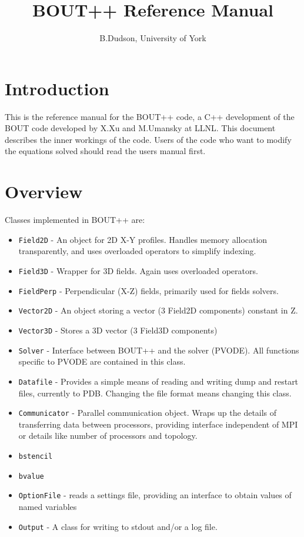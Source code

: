 \documentclass[12pt, a4paper]{article}
\newcommand{\code}[1]{\texttt{#1}}
\begin{document}
\title{BOUT++ Reference Manual}
\author{B.Dudson, University of York}

\maketitle

\tableofcontents

\section{Introduction}

This is the reference manual for the BOUT++ code\cite{Dudson2009,dudson-2008-arxiv}, a C++ development of the
BOUT code developed by X.Xu and M.Umansky at LLNL. This document describes
the inner workings of the code. Users of the code who want to modify 
the equations solved should read the users manual first.

\section{Overview}

Classes implemented in BOUT++ are:
\begin{itemize}
\item \code{Field2D} - An object for 2D X-Y profiles. Handles memory allocation transparently,
  and uses overloaded operators to simplify indexing.
\item \code{Field3D} - Wrapper for 3D fields. Again uses overloaded operators.
\item \code{FieldPerp} - Perpendicular (X-Z) fields, primarily used for fields solvers.
\item \code{Vector2D} - An object storing a vector (3 Field2D components) constant in Z.
\item \code{Vector3D} - Stores a 3D vector (3 Field3D components)
\item \code{Solver} - Interface between BOUT++ and the solver (PVODE). All
  functions specific to PVODE are contained in this class.
\item \code{Datafile} - Provides a simple means of reading and writing dump and restart files,
  currently to PDB. Changing the file format means changing this class.
\item \code{Communicator} - Parallel communication object. Wraps up the details
  of transferring data between processors, providing interface independent of MPI or
  details like number of processors and topology.
\item \code{bstencil}
\item \code{bvalue}
\item \code{OptionFile} - reads a settings file, providing an interface to obtain values
  of named variables
\item \code{Output} - A class for writing to stdout and/or a log file.
\end{itemize}
\end{document}
